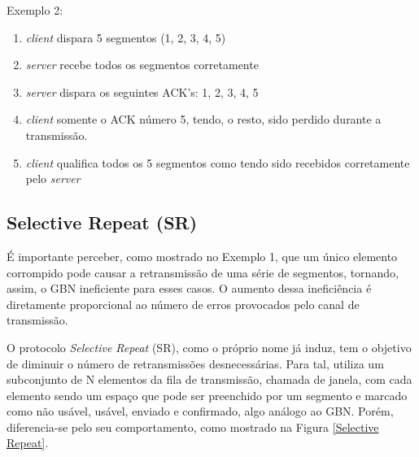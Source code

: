 Exemplo 2:

\begin{enumerate}
\def\labelenumi{\arabic{enumi}.}
\tightlist
\item
  \emph{client} dispara 5 segmentos (1, 2, 3, 4, 5)
\item
  \emph{server} recebe todos os segmentos corretamente
\item
  \emph{server} dispara os seguintes ACK's: 1, 2, 3, 4, 5
\item
  \emph{client} somente o ACK número 5, tendo, o resto, sido perdido
  durante a transmissão.
\item
  \emph{client} qualifica todos os 5 segmentos como tendo sido recebidos
  corretamente pelo \emph{server}
\end{enumerate}

\hypertarget{selective-repeat-sr}{%
\subsection{Selective Repeat (SR)}\label{selective-repeat-sr}}

É importante perceber, como mostrado no Exemplo 1, que um único elemento
corrompido pode causar a retransmissão de uma série de segmentos,
tornando, assim, o GBN ineficiente para esses casos. O aumento dessa
ineficiência é diretamente proporcional ao número de erros provocados
pelo canal de transmissão.

O protocolo \emph{Selective Repeat} (SR), como o próprio nome já induz,
tem o objetivo de diminuir o número de retransmissões desnecessárias.
Para tal, utiliza um subconjunto de N elementos da fila de transmissão,
chamada de janela, com cada elemento sendo um espaço que pode ser
preenchido por um segmento e marcado como não usável, usável, enviado e
confirmado, algo análogo ao GBN. Porém, diferencia-se pelo seu
comportamento, como mostrado na Figura \ref{Selective Repeat}.


